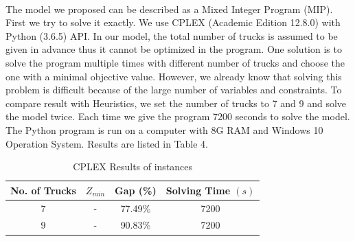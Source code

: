 \documentclass[12pt]{article}
\numberwithin{equation}{section}
\begin{document}
	\paragraph{}The model we proposed can be described as a Mixed Integer Program (MIP). First we try to solve it exactly. We use CPLEX (Academic Edition 12.8.0) with Python (3.6.5) API. In our model, the total number of trucks is assumed to be given in advance thus it cannot be optimized in the program. One solution is to solve the program multiple times with different number of trucks and choose the one with a minimal objective value. However, we already know that solving this problem is difficult because of the large number of variables and constraints. To compare result with Heuristics, we set the number of trucks to 7 and 9 and solve the model twice. Each time we give the program 7200 seconds to solve the model. The Python program is run on a computer with 8G RAM and Windows 10 Operation System. Results are listed in Table 4.
	
	\begin{table}[htbp]
	\begin{center}
	\caption{CPLEX Results of instances}
	\begin{tabular}{cccc}
	\hline
	No. of Trucks & $Z_{min}$ & Gap (\%) & Solving Time $(s)$ \\
	\hline
	7 & - & 77.49\% & 7200 \\
	9 & - & 90.83\% & 7200 \\
	\hline
	\end{tabular}	
	
	\end{center}
	\end{table}
	
\end{document}
